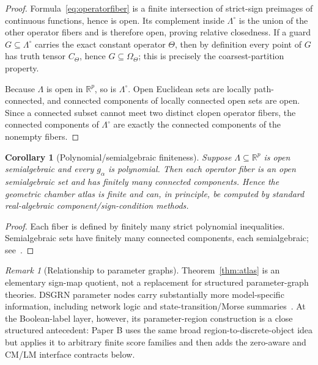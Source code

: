 \documentclass[11pt]{article}
\newtheorem{corollary}[theorem]{Corollary}
\theoremstyle{definition}
\theoremstyle{remark}
\newtheorem{remark}[theorem]{Remark}
\newcommand{\R}{\mathbb{R}}
\begin{document}
\begin{proof}
Formula~\eqref{eq:operatorfiber} is a finite intersection of strict-sign preimages of continuous functions, hence is open. Its complement inside $\Lambda^\circ$ is the union of the other operator fibers and is therefore open, proving relative closedness. If a guard $G\subseteq\Lambda^\circ$ carries the exact constant operator $\Theta$, then by definition every point of $G$ has truth tensor $C_\Theta$, hence $G\subseteq\Omega_\Theta$; this is precisely the coarsest-partition property.

Because $\Lambda$ is open in $\R^p$, so is $\Lambda^\circ$. Open Euclidean sets are locally path-connected, and connected components of locally connected open sets are open. Since a connected subset cannot meet two distinct clopen operator fibers, the connected components of $\Lambda^\circ$ are exactly the connected components of the nonempty fibers.
\end{proof}

\begin{corollary}[Polynomial/semialgebraic finiteness]\label{cor:semialg}
Suppose $\Lambda\subseteq\R^p$ is open semialgebraic and every $g_\alpha$ is polynomial. Then each operator fiber is an open semialgebraic set and has finitely many connected components. Hence the geometric chamber atlas is finite and can, in principle, be computed by standard real-algebraic component/sign-condition methods.
\end{corollary}

\begin{proof}
Each fiber is defined by finitely many strict polynomial inequalities. Semialgebraic sets have finitely many connected components, each semialgebraic; see~\cite{BasuPollackRoy2006}.
\end{proof}

\begin{remark}[Relationship to parameter graphs]
Theorem~\ref{thm:atlas} is an elementary sign-map quotient, not a replacement for structured parameter-graph theories. DSGRN parameter nodes carry substantially more model-specific information, including network logic and state-transition/Morse summaries~\cite{CumminsEtAl2018,Gedeon2020}. At the Boolean-label layer, however, its parameter-region construction is a close structured antecedent: Paper B uses the same broad region-to-discrete-object idea but applies it to arbitrary finite score families and then adds the zero-aware and CM/LM interface contracts below.
\end{remark}
\end{document}
